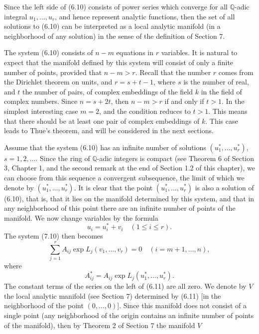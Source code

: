 \documentclass{article}
\begin{document}
Since the left side of (6.10) consists of power series which converge for all $\mathbb{Q}$-adic 
integral $u_1, \ldots, u_r$, and hence represent analytic functions, then the set of all solutions 
to (6.10) can be interpreted as a local analytic manifold (in a neighborhood of any solution) in 
the sense of the definition of Section 7.

The system (6.10) consists of $n - m$ equations in $r$ variables. It is natural to expect that the 
manifold defined by this system will consist of only a finite number of points, provided that $n - m > r$. 
Recall that the number $r$ comes from the Dirichlet theorem on units, and $r = s + t - 1$, where $s$ is the 
number of real, and $t$ the number of pairs, of complex embeddings of the field $k$ in the field of complex 
numbers. Since $n = s + 2t$, then $n - m > r$ if and only if $t > 1$. In the simplest interesting case $m = 2$, 
and the condition reduces to $t > 1$. This means that there should be at least one pair of complex embeddings 
of $k$. This case leads to Thue's theorem, and will be considered in the next sections.

Assume that the system (6.10) has an infinite number of solutions $(u_1^*, \ldots, u_r^*)$, $s = 1, 2, \ldots$. 
Since the ring of $\mathbb{Q}$-adic integers is compact (see Theorem 6 of Section 3, Chapter 1, and the second 
remark at the end of Section 1.2 of this chapter), we can choose from this sequence a convergent subsequence, 
the limit of which we denote by $(u_1^*, \ldots, u_r^*)$. It is clear that the point $(u_1^*, \ldots, u_r^*)$ is 
also a solution of (6.10), that is, that it lies on the manifold determined by this system, and that in any 
neighborhood of this point there are an infinite number of points of the manifold. We now change variables by 
the formula
\begin{equation}
u_i = u_i^* + v_i \quad (1 \leq i \leq r).
\end{equation}
The system (7.10) then becomes
\begin{equation}
\sum_{j=1}^r A_{ij} \exp L_j(v_1, \ldots, v_r) = 0 \quad (i = m + 1, \ldots, n),
\end{equation}
where
\begin{equation}
A_{ij}^* = A_{ij} \exp L_j(u_1^*, \ldots, u_r^*).
\end{equation}
The constant terms of the series on the left of (6.11) are all zero. We denote by $V$ the local analytic 
manifold (see Section 7) determined by (6.11) [in the neighborhood of the point $(0, \ldots, 0)$]. Since this 
manifold does not consist of a single point (any neighborhood of the origin contains an infinite number of points 
of the manifold), then by Theorem 2 of Section 7 the manifold $V$
\end{document}
